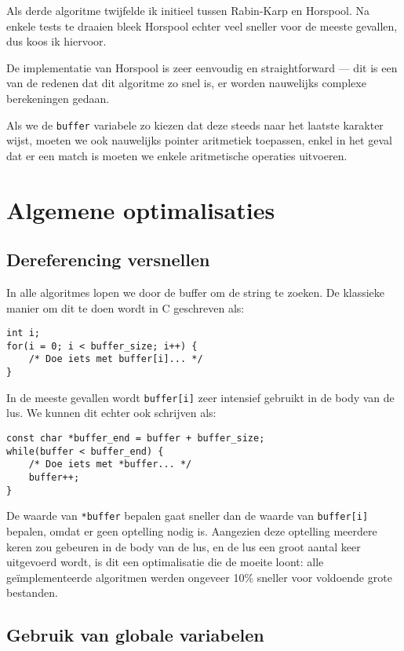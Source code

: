 \documentclass[a4paper,11pt]{article}
\begin{document}
Als derde algoritme twijfelde ik initieel tussen Rabin-Karp en Horspool. Na
enkele tests te draaien bleek Horspool echter veel sneller voor de meeste
gevallen, dus koos ik hiervoor.

De implementatie van Horspool is zeer eenvoudig en straightforward — dit is een
van de redenen dat dit algoritme zo snel is, er worden nauwelijks complexe
berekeningen gedaan.

Als we de \verb#buffer# variabele zo kiezen dat deze steeds naar het laatste
karakter wijst, moeten we ook nauwelijks pointer aritmetiek toepassen, enkel in
het geval dat er een match is moeten we enkele aritmetische operaties uitvoeren.

\section{Algemene optimalisaties}

\subsection{Dereferencing versnellen}

In alle algoritmes lopen we door de buffer om de string te zoeken. De klassieke
manier om dit te doen wordt in C geschreven als:

\begin{verbatim}
int i;
for(i = 0; i < buffer_size; i++) {
    /* Doe iets met buffer[i]... */
}
\end{verbatim}

In de meeste gevallen wordt \verb#buffer[i]# zeer intensief gebruikt in de body
van de lus. We kunnen dit echter ook schrijven als:

\begin{verbatim}
const char *buffer_end = buffer + buffer_size;
while(buffer < buffer_end) {
    /* Doe iets met *buffer... */
    buffer++;
}
\end{verbatim}

De waarde van \verb#*buffer# bepalen gaat sneller dan de waarde van
\verb#buffer[i]# bepalen, omdat er geen optelling nodig is. Aangezien deze
optelling meerdere keren zou gebeuren in de body van de lus, en de lus een groot
aantal keer uitgevoerd wordt, is dit een optimalisatie die de moeite loont: alle
ge\"implementeerde algoritmen werden ongeveer 10\% sneller voor voldoende grote
bestanden.

\subsection{Gebruik van globale variabelen}
\end{document}
